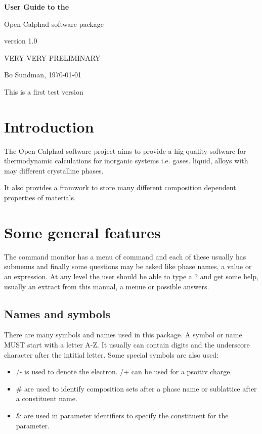 \documentclass[12pt]{article}
\begin{document}
\begin{center}

{\Huge \bf User Guide to the 

Open Calphad software package

version 1.0

}

VERY VERY PRELIMINARY

Bo Sundman, \today

\end{center}

This is a first test version

\section{Introduction}

The Open Calphad software project aims to provide a hig quality
software for thermodynamic calculations for inorganic systems i.e.
gases. liquid, alloys with may different crystalline phases.

It also provides a framwork to store many different composition
dependent properties of materials.

\section{Some general features}

The command monitor has a menu of command and each of these usually
has submenus and finally some questions may be asked like phase names,
a value or an expression.  At any level the user should be able to
type a ? and get some help, usually an extract from this manual, a
menue or possible answers.

\subsection{Names and symbols}

There are many symbols and names used in this package.  A symbol or
name MUST start with a letter A-Z.  It usually can contain digits and
the underscore character after the intitial letter.  Some special
symbols are also used:

\begin{itemize}
\item /- is used to denote the electron. /+ can be used for a psoitiv charge.
\item \# are used to identify composition sets after a phase name or
sublattice after a constituent name.
\item \& are used in parameter identifiers to specify the constituent
for the parameter.
\end{itemize}
\end{document}
